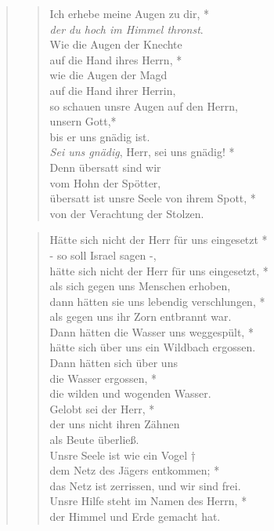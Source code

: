 

\begin{quote}
\begin{verse}


\smallskip

Ich erhebe meine Augen zu dir, *\\
\textit{der du hoch im Himmel thronst}.\\
\vin Wie die Augen der Knechte\\
\vin auf die Hand ihres Herrn, *\\
\vin wie die Augen der Magd \\
\vin auf die Hand ihrer Herrin,\\
so schauen unsre Augen auf den Herrn,\\
unsern Gott,*\\
bis er uns gnädig ist.\\
\vin \textit{Sei uns gnädig}, Herr, sei uns gnädig! *\\
\vin Denn übersatt sind wir\\ 
\vin vom Hohn der Spötter,\\
übersatt ist unsre Seele von ihrem Spott, *\\
von der Verachtung der Stolzen.\\

\end{verse}

\begin{verse}

\smallskip

Hätte sich nicht der Herr für uns eingesetzt *\\
- so soll Israel sagen -,\\
\vin hätte sich nicht der Herr für uns eingesetzt, *\\
\vin als sich gegen uns Menschen erhoben,\\
dann hätten sie uns lebendig verschlungen, *\\
als gegen uns ihr Zorn entbrannt war.\\
\vin Dann hätten die Wasser uns weggespült, *\\
\vin hätte sich über uns ein Wildbach ergossen.\\
Dann hätten sich über uns\\
die Wasser ergossen, *\\
die wilden und wogenden Wasser.\\
\vin Gelobt sei der Herr, *\\
\vin der uns nicht ihren Zähnen\\ 
\vin als Beute überließ.\\
Unsre Seele ist wie ein Vogel †\\
dem Netz des Jägers entkommen; *\\
das Netz ist zerrissen, und wir sind frei.\\
\vin Unsre Hilfe steht im Namen des Herrn, *\\
\vin der Himmel und Erde gemacht hat.\\


\end{verse}
\end{quote}
